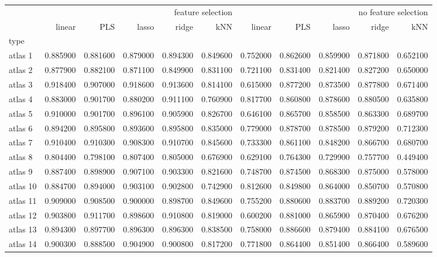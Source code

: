 \documentclass[a4paper]{article}
\begin{document}
\thispagestyle{empty}
\begin{landscape}
\begin{tabular}{lrrrrrrrrrr}
\toprule
 & \multicolumn{5}{r}{feature selection} & \multicolumn{5}{r}{no feature selection} \\
 & linear & PLS & lasso & ridge & kNN & linear & PLS & lasso & ridge & kNN \\
type &  &  &  &  &  &  &  &  &  &  \\
\midrule
atlas 1 & 0.885900 & 0.881600 & 0.879000 & 0.894300 & 0.849600 & 0.752000 & 0.862600 & 0.859900 & 0.871800 & 0.652100 \\
atlas 2 & 0.877900 & 0.882100 & 0.871100 & 0.849900 & 0.831100 & 0.721100 & 0.831400 & 0.821400 & 0.827200 & 0.650000 \\
atlas 3 & 0.918400 & 0.907000 & 0.918600 & 0.913600 & 0.814100 & 0.615000 & 0.877200 & 0.873500 & 0.877800 & 0.671400 \\
atlas 4 & 0.883000 & 0.901700 & 0.880200 & 0.911100 & 0.760900 & 0.817700 & 0.860800 & 0.878600 & 0.880500 & 0.635800 \\
atlas 5 & 0.910000 & 0.901700 & 0.896100 & 0.905900 & 0.826700 & 0.646100 & 0.865700 & 0.858500 & 0.863300 & 0.689700 \\
atlas 6 & 0.894200 & 0.895800 & 0.893600 & 0.895800 & 0.835000 & 0.779000 & 0.878700 & 0.878500 & 0.879200 & 0.712300 \\
atlas 7 & 0.910400 & 0.910300 & 0.908300 & 0.910700 & 0.845600 & 0.733300 & 0.861100 & 0.848200 & 0.866700 & 0.680700 \\
atlas 8 & 0.804400 & 0.798100 & 0.807400 & 0.805000 & 0.676900 & 0.629100 & 0.764300 & 0.729900 & 0.757700 & 0.449400 \\
atlas 9 & 0.887400 & 0.898900 & 0.907100 & 0.903300 & 0.821600 & 0.748700 & 0.874500 & 0.868300 & 0.875000 & 0.578000 \\
atlas 10 & 0.884700 & 0.894000 & 0.903100 & 0.902800 & 0.742900 & 0.812600 & 0.849800 & 0.864000 & 0.850700 & 0.570800 \\
atlas 11 & 0.909000 & 0.908500 & 0.900000 & 0.898700 & 0.849600 & 0.755200 & 0.880600 & 0.883700 & 0.889200 & 0.720300 \\
atlas 12 & 0.903800 & 0.911700 & 0.898600 & 0.910800 & 0.819000 & 0.600200 & 0.881000 & 0.865900 & 0.870400 & 0.676200 \\
atlas 13 & 0.894300 & 0.897700 & 0.896300 & 0.896300 & 0.838500 & 0.758000 & 0.886600 & 0.879400 & 0.884100 & 0.676500 \\
atlas 14 & 0.900300 & 0.888500 & 0.904900 & 0.900800 & 0.817200 & 0.771800 & 0.864400 & 0.851400 & 0.866400 & 0.589600 \\

\end{tabular}
\end{landscape}
\end{document}
